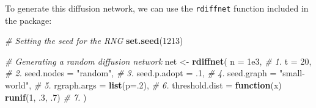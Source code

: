 \documentclass[]{book}
\newenvironment{Shaded}{\begin{snugshade}}{\end{snugshade}}
\newcommand{\CommentTok}[1]{\textcolor[rgb]{0.56,0.35,0.01}{\textit{#1}}}
\newcommand{\ControlFlowTok}[1]{\textcolor[rgb]{0.13,0.29,0.53}{\textbf{#1}}}
\newcommand{\DataTypeTok}[1]{\textcolor[rgb]{0.13,0.29,0.53}{#1}}
\newcommand{\DecValTok}[1]{\textcolor[rgb]{0.00,0.00,0.81}{#1}}
\newcommand{\FloatTok}[1]{\textcolor[rgb]{0.00,0.00,0.81}{#1}}
\newcommand{\KeywordTok}[1]{\textcolor[rgb]{0.13,0.29,0.53}{\textbf{#1}}}
\newcommand{\NormalTok}[1]{#1}
\newcommand{\StringTok}[1]{\textcolor[rgb]{0.31,0.60,0.02}{#1}}
\begin{document}
To generate this diffusion network, we can use the \texttt{rdiffnet} function included in the package:

\begin{Shaded}
\begin{Highlighting}[]
\CommentTok{# Setting the seed for the RNG}
\KeywordTok{set.seed}\NormalTok{(}\DecValTok{1213}\NormalTok{)}

\CommentTok{# Generating a random diffusion network}
\NormalTok{net <-}\StringTok{ }\KeywordTok{rdiffnet}\NormalTok{(}
  \DataTypeTok{n              =} \FloatTok{1e3}\NormalTok{,                         }\CommentTok{# 1.}
  \DataTypeTok{t              =} \DecValTok{20}\NormalTok{,                          }\CommentTok{# 2.}
  \DataTypeTok{seed.nodes     =} \StringTok{"random"}\NormalTok{,                    }\CommentTok{# 3.}
  \DataTypeTok{seed.p.adopt   =} \FloatTok{.1}\NormalTok{,                          }\CommentTok{# 4.}
  \DataTypeTok{seed.graph     =} \StringTok{"small-world"}\NormalTok{,               }\CommentTok{# 5.}
  \DataTypeTok{rgraph.args    =} \KeywordTok{list}\NormalTok{(}\DataTypeTok{p=}\NormalTok{.}\DecValTok{2}\NormalTok{),                  }\CommentTok{# 6.}
  \DataTypeTok{threshold.dist =} \ControlFlowTok{function}\NormalTok{(x) }\KeywordTok{runif}\NormalTok{(}\DecValTok{1}\NormalTok{, }\FloatTok{.3}\NormalTok{, }\FloatTok{.7}\NormalTok{) }\CommentTok{# 7.}
\NormalTok{  )}
\end{Highlighting}
\end{Shaded}
\end{document}
